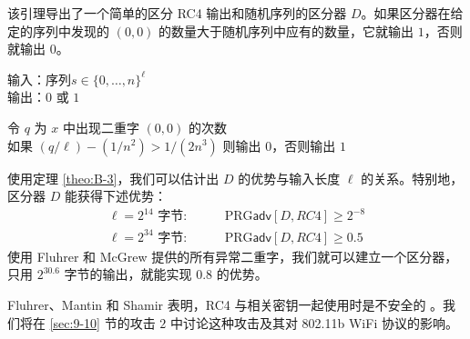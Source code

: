 该引理导出了一个简单的区分 RC4 输出和随机序列的区分器 $D$。如果区分器在给定的序列中发现的 $(0,0)$ 的数量大于随机序列中应有的数量，它就输出 $1$，否则就输出 $0$。

\vspace*{10pt}

\hspace*{5pt} 输入：序列$s\in\{0,\dots,n\}^\ell$\\
\hspace*{26pt} 输出：$0$ 或 $1$

\vspace{5pt}

\hspace*{5pt} 令 $q$ 为 $x$ 中出现二重字 $(0,0)$ 的次数\\
\hspace*{26pt} 如果 $(q/\ell)-(1/n^2)>1/(2n^3)$ 则输出 $0$，否则输出 $1$

\vspace*{10pt}

使用定理 \ref{theo:B-3}，我们可以估计出 $D$ 的优势与输入长度 $\ell$ 的关系。特别地，区分器 $D$ 能获得下述优势：
\[
\begin{aligned}
\ell=2^{14}\text{ 字节}: &\quad\quad \mathrm{PRG}\mathsf{adv}[D,RC4]\geq2^{-8}\\
\ell=2^{34}\text{ 字节}: &\quad\quad \mathrm{PRG}\mathsf{adv}[D,RC4]\geq0.5
\end{aligned}
\]
使用 Fluhrer 和 McGrew 提供的所有异常二重字，我们就可以建立一个区分器，只用 $2^{30.6}$ 字节的输出，就能实现 $0.8$ 的优势。

\begin{snote}[针对 RC4 的相关密钥攻击。]
Fluhrer、Mantin 和 Shamir 表明，RC4 与相关密钥一起使用时是不安全的 \cite{fluhrer2001weaknesses}。我们将在 \ref{sec:9-10} 节的攻击 $2$ 中讨论这种攻击及其对 802.11b WiFi 协议的影响。
\end{snote}